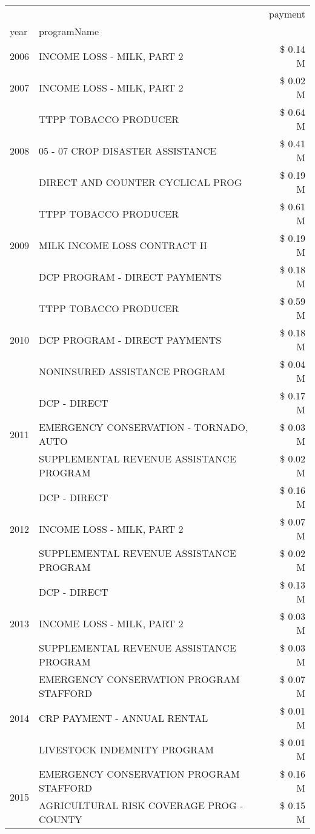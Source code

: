 \begin{tabular}{llr}
\toprule
 &  & payment \\
year & programName &  \\
\midrule
2006 & INCOME LOSS - MILK, PART 2 & \$ 0.14 M \\
\cline{1-3}
2007 & INCOME LOSS - MILK, PART 2 & \$ 0.02 M \\
\cline{1-3}
\multirow[t]{3}{*}{2008} & TTPP TOBACCO PRODUCER & \$ 0.64 M \\
 & 05 - 07 CROP DISASTER ASSISTANCE & \$ 0.41 M \\
 & DIRECT AND COUNTER CYCLICAL PROG & \$ 0.19 M \\
\cline{1-3}
\multirow[t]{3}{*}{2009} & TTPP TOBACCO PRODUCER & \$ 0.61 M \\
 & MILK INCOME LOSS CONTRACT II & \$ 0.19 M \\
 & DCP PROGRAM - DIRECT PAYMENTS & \$ 0.18 M \\
\cline{1-3}
\multirow[t]{3}{*}{2010} & TTPP TOBACCO PRODUCER & \$ 0.59 M \\
 & DCP PROGRAM - DIRECT PAYMENTS & \$ 0.18 M \\
 & NONINSURED ASSISTANCE PROGRAM & \$ 0.04 M \\
\cline{1-3}
\multirow[t]{3}{*}{2011} & DCP - DIRECT & \$ 0.17 M \\
 & EMERGENCY CONSERVATION - TORNADO, AUTO & \$ 0.03 M \\
 & SUPPLEMENTAL REVENUE ASSISTANCE PROGRAM & \$ 0.02 M \\
\cline{1-3}
\multirow[t]{3}{*}{2012} & DCP - DIRECT & \$ 0.16 M \\
 & INCOME LOSS - MILK, PART 2 & \$ 0.07 M \\
 & SUPPLEMENTAL REVENUE ASSISTANCE PROGRAM & \$ 0.02 M \\
\cline{1-3}
\multirow[t]{3}{*}{2013} & DCP - DIRECT & \$ 0.13 M \\
 & INCOME LOSS - MILK, PART 2 & \$ 0.03 M \\
 & SUPPLEMENTAL REVENUE ASSISTANCE PROGRAM & \$ 0.03 M \\
\cline{1-3}
\multirow[t]{3}{*}{2014} & EMERGENCY CONSERVATION PROGRAM STAFFORD & \$ 0.07 M \\
 & CRP PAYMENT - ANNUAL RENTAL & \$ 0.01 M \\
 & LIVESTOCK INDEMNITY PROGRAM & \$ 0.01 M \\
\cline{1-3}
\multirow[t]{3}{*}{2015} & EMERGENCY CONSERVATION PROGRAM STAFFORD & \$ 0.16 M \\
 & AGRICULTURAL RISK COVERAGE PROG - COUNTY & \$ 0.15 M \\

\end{tabular}
